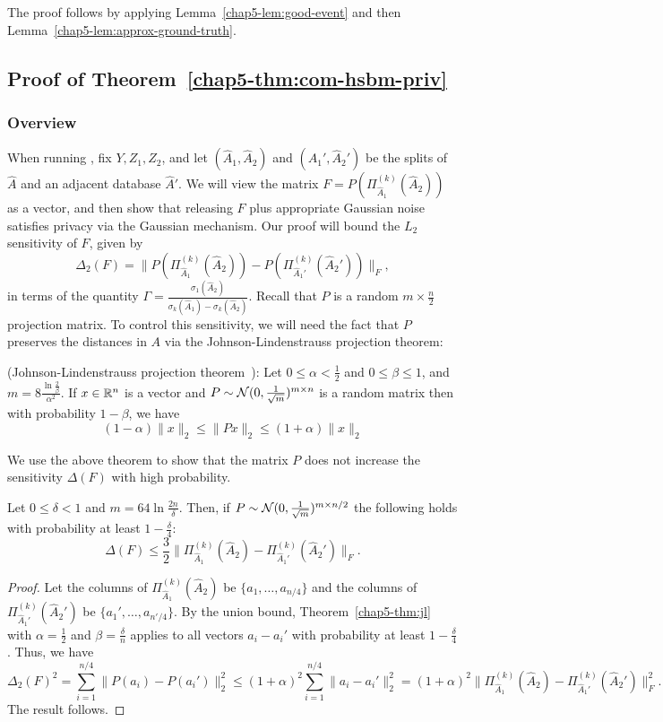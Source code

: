 The proof follows by applying Lemma~\ref{chap5-lem:good-event} and then Lemma~\ref{chap5-lem:approx-ground-truth}.

\subsection{Proof of Theorem~\ref{chap5-thm:com-hsbm-priv}}\label{chap5-sec:com-hsbm-priv}
\subsubsection{Overview}
When running \dpcom{}, fix $Y,Z_1,Z_2$, and let $(\hat{A}_1, \hat{A}_2)$ and $(\hat{A}_1', \hat{A}_2')$ be the splits of $\hat{A}$ and an adjacent database $\hat{A}'$.
We will view the matrix $F = P(\Pi_{\hat{A}_1}^{(k)}(\hat{A}_2))$ as a vector, and then show that releasing $F$ plus appropriate Gaussian noise satisfies privacy via the Gaussian mechanism. Our proof will bound the $L_2$ sensitivity of $F$, given by
\[
    \Delta_2(F) = \|P(\Pi_{\hat{A}_1}^{(k)}(\hat{A}_2)) - P(\Pi_{\hat{A}_1'}^{(k)}(\hat{A}_2'))\|_F,
\]
in terms of the quantity $\Gamma = \frac{\sigma_1(\hat{A}_2)}{\sigma_k(\hat{A}_1) - \sigma_k(\hat{A}_2)}$. Recall that $P$ is a random $m \times \frac{n}{2}$ projection matrix. To control this sensitivity, we will need the fact that $P$ preserves the distances in $A$ via the Johnson-Lindenstrauss projection theorem:
\begin{thm}\label{chap5-thm:jl}
(Johnson-Lindenstrauss projection theorem~\citep{johnson1984extensions}): Let $0 \leq \alpha < \frac{1}{2}$ and $0 \leq \beta \leq 1$, and $m = 8\frac{ \ln \frac{2}{\beta}}{\alpha^2}$. If $x \in \mathbb{R}^n$ is a vector and $P \sim \mathcal{N}(0, \frac{1}{\sqrt{m}})^{m \times n}$ is a random matrix then with probability $1-\beta$, we have
\[
(1-\alpha) \|x\|_2 \leq \|Px\|_2 \leq (1+\alpha) \|x\|_2
\]
\end{thm}
We use the above theorem to show that the matrix $P$ does not increase the sensitivity $\Delta(F)$ with high probability.
\begin{lem}\label{chap5-lem:proj-sens}
    Let $0 \leq \delta < 1$ and $m = 64 \ln \frac{2n}{\delta}$. Then, if $P \sim \mathcal{N}(0, \frac{1}{\sqrt{m}})^{m \times n/2}$ the following holds with probability at least $1-\frac \delta 4$:
    \[
        \Delta(F) \leq \frac 3 2 \|\Pi_{\hat{A}_1}^{(k)}(\hat{A}_2) - \Pi_{\hat{A}_1'}^{(k)}(\hat{A}_2')\|_F.
    \]
\end{lem}
\begin{proof}
Let the columns of $\Pi_{\hat{A}_1}^{(k)}(\hat{A}_2)$ be $\{a_1, \ldots, a_{n/4}\}$ and the columns of $\Pi_{\hat{A}_1'}^{(k)}(\hat{A}_2')$ be $\{a_1', \ldots, a_{n'/4}\}$. By the union bound, Theorem~\ref{chap5-thm:jl} with $\alpha=\frac{1}{2}$ and $\beta = \frac{\delta}{n}$ applies to all vectors $a_i - a_i'$ with probability at least $1-\frac{\delta}{4}$. Thus, we have
\[
\Delta_2(F)^2 = \sum_{i=1}^{n/4} \|P(a_i) - P(a_i')\|_2^2 \leq (1+\alpha)^2 \sum_{i=1}^{n/4} \|a_i - a_i'\|_2^2 = (1+\alpha)^2  \|\Pi_{\hat{A}_1}^{(k)}(\hat{A}_2) - \Pi_{\hat{A}_1'}^{(k)}(\hat{A}_2')\|_F^2.
\]
The result follows.
\end{proof}
